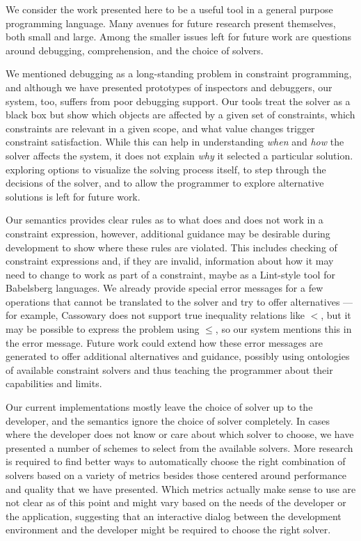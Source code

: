 We consider the work presented here to be a useful tool in a general
purpose programming language. Many avenues for future research present
themselves, both small and large. Among the smaller issues left for future
work are questions around debugging, comprehension, and the choice of
solvers.

We mentioned debugging as a long-standing problem in constraint programming, and
although we have presented prototypes of inspectors and debuggers, our system,
too, suffers from poor debugging support. Our tools treat the solver as a black
box but show which objects are affected by a given set of constraints, which
constraints are relevant in a given scope, and what value changes trigger
constraint satisfaction. While this can help in understanding \emph{when} and
\emph{how} the solver affects the system, it does not explain \emph{why} it
selected a particular solution. exploring options to visualize the solving
process itself, to step through the decisions of the solver, and to allow the
programmer to explore alternative solutions is left for future work.

Our semantics provides clear rules as to what does and does not work in a
constraint expression, however, additional guidance may be desirable during
development to show where these rules are violated. This includes checking of
constraint expressions and, if they are invalid, information about how it may
need to change to work as part of a constraint, maybe as a Lint-style tool for
Babelsberg languages. We already provide special error messages for a few
operations that cannot be translated to the solver and try to offer
alternatives --- for example, Cassowary does not support true inequality
relations like $<$, but it may be possible to express the problem using $\leq$,
so our system mentions this in the error message. Future work could extend how
these error messages are generated to offer additional alternatives and
guidance, possibly using ontologies of available constraint solvers and thus
teaching the programmer about their capabilities and limits.

Our current implementations mostly leave the choice of solver up to the
developer, and the semantics ignore the choice of solver completely. In cases
where the developer does not know or care about which solver to choose, we have
presented a number of schemes to select from the available solvers. More
research is required to find better ways to automatically choose the right
combination of solvers based on a variety of metrics besides those centered
around performance and quality that we have presented. Which metrics actually
make sense to use are not clear as of this point and might vary based on the
needs of the developer or the application, suggesting that an interactive dialog
between the development environment and the developer might be required to
choose the right solver.

